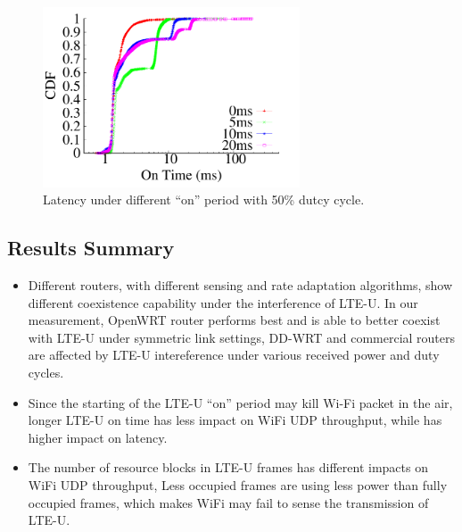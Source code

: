 \begin{figure}[!ht]
 \centering
    \includegraphics[width=3.0in]{./figures/impact_latency_ontime}
 \caption{Latency under different ``on'' period with 50\% dutcy cycle.}
  \label{fig:impact_latency}
\end{figure}


\subsection {Results Summary}

\begin{itemize}

\item Different routers, with different sensing and 
rate adaptation algorithms, show different coexistence 
capability under the interference of LTE-U. 
In our measurement, OpenWRT router performs best and is able
to better coexist with LTE-U under symmetric link settings, 
DD-WRT and commercial routers are affected by LTE-U
intereference under various received power and duty cycles. 
 

\item Since the starting of the LTE-U ``on'' period may kill Wi-Fi packet 
  in the air, longer LTE-U on time has less impact on WiFi UDP throughput, while
has higher impact on latency.  


\item The number of resource blocks in LTE-U frames has different impacts on WiFi UDP throughput, 
Less occupied frames are using less power than fully occupied frames, 
which makes WiFi may fail to sense the transmission of LTE-U. 


\end{itemize}





